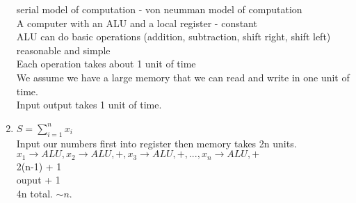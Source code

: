 \documentclass{amsart}
\begin{document}
\begin{enumerate}
        serial model of computation - von neumman model of computation\\
        A computer with an ALU and a local register - constant\\
        ALU can do basic operations (addition, subtraction, shift right, shift left) reasonable and simple\\
        Each operation takes about 1 unit of time\\
        We assume we have a large memory that we can read and write in one unit of time.\\
        Input output takes 1 unit of time.\\
    \item $S = \sum_{i=1}^{n}x_i$\\
        Input our numbers first into register then memory takes 2n units.\\
        $x_1 \rightarrow ALU, x_2 \rightarrow ALU, +, x_3 \rightarrow ALU, +, ..., x_n \rightarrow ALU, +$\\
        2(n-1) + 1\\
        ouput + 1\\
        4n total. $\sim n$.
\end{enumerate}
\end{document}
